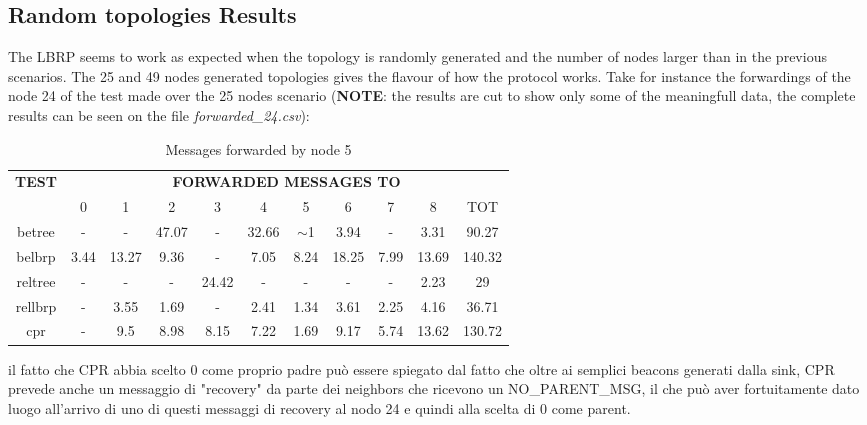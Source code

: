 \documentclass{article}
\begin{document}
	\subsection{Random topologies Results}
The LBRP seems to work as expected when the topology is randomly generated and the number of nodes larger than in the previous scenarios. The 25 and 49 nodes generated topologies gives the flavour of how the protocol works. Take for instance the forwardings of the node 24 of the test made over the 25 nodes scenario (\textbf{NOTE}: the results are cut to show only some of the meaningfull data, the complete results can be seen on the file \textit{forwarded\_24.csv}):

		\begin{table}[H]
			\begin{center}
			    \begin{tabular}{|c|c|c|c|c|c|c|c|c|c|c|}
				    \hline
				    \multirow{2}{*}{\textbf{TEST}} & \multicolumn{10}{c|}{\textbf{FORWARDED MESSAGES TO}} \\ \cline{2-11}
					& 0 & 1 & 2 & 3 & 4 & 5& 6 & 7 & 8 & TOT \\ \hline
				    betree & - & - & 47.07 & - & 32.66 & $\sim$1 & 3.94 & - & 3.31 & 90.27 \\ \hline
				    belbrp & 3.44 & 13.27 & 9.36 & - & 7.05 & 8.24 & 18.25 & 7.99 & 13.69 & 140.32\\ \hline
				    reltree & - & - & - & 24.42 & - & - & - & - & 2.23 & 29\\ \hline
   				    rellbrp & - & 3.55 & 1.69 & - & 2.41 & 1.34 & 3.61 & 2.25 & 4.16 & 36.71\\ \hline
				    cpr & - & 9.5 & 8.98 & 8.15 & 7.22 & 1.69 & 9.17 & 5.74 & 13.62 & 130.72\\ \hline
			    \end{tabular}
			\end{center}	
			\caption{Messages forwarded by node 5}
			\label{tab:25F24}
		\end{table}


il fatto che CPR abbia scelto 0 come proprio padre può essere spiegato dal fatto che oltre ai semplici beacons generati dalla sink, CPR prevede anche un messaggio di "recovery" da parte dei neighbors che ricevono un NO\_PARENT\_MSG, il che può aver fortuitamente dato luogo all'arrivo di uno di questi messaggi di recovery al nodo 24 e quindi alla scelta di 0 come parent.
\clearpage
\end{document}
